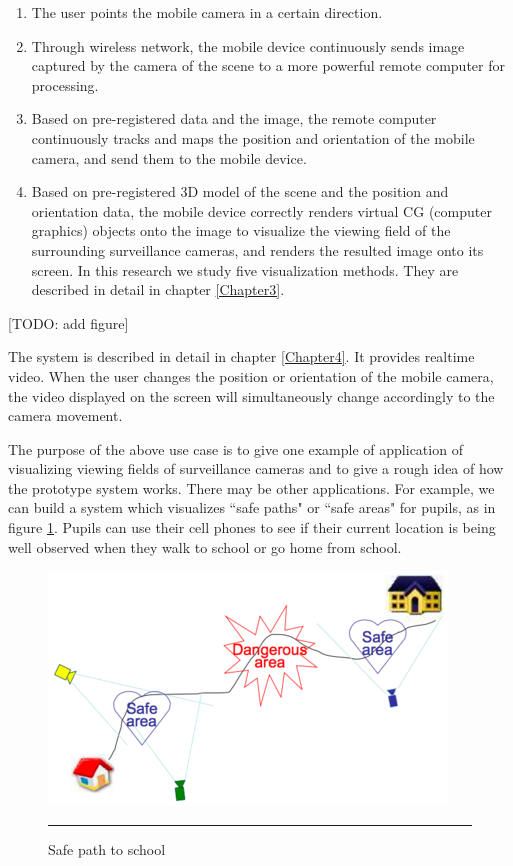 \begin{enumerate}
	\item The user points the mobile camera in a certain direction.
	\item Through wireless network, the mobile device continuously sends image captured by the camera of the scene to a more powerful remote computer for processing.
	\item Based on pre-registered data and the image, the remote computer continuously tracks and maps the position and orientation of the mobile camera, and send them to the mobile device.
	\item Based on pre-registered 3D model of the scene and the position and orientation data, the mobile device correctly renders virtual CG (computer graphics) objects onto the image to visualize the viewing field of the surrounding surveillance cameras, and renders the resulted image onto its screen. In this research we study five visualization methods. They are described in detail in chapter \ref{Chapter3}.
\end{enumerate}

[TODO: add figure]

The system is described in detail in chapter \ref{Chapter4}. It provides realtime video. When the user changes the position or orientation of the mobile camera, the video displayed on the screen will simultaneously change accordingly to the camera movement.

The purpose of the above use case is to give one example of application of visualizing viewing fields of surveillance cameras and to give a rough idea of how the prototype system works. There may be other applications. For example, we can build a system which visualizes ``safe paths" or ``safe areas" for pupils, as in figure \ref{fig:HomeSchool}. Pupils can use their cell phones to see if their current location is being well observed when they walk to school or go home from school.

\begin{figure}[htbp]
	\centering
	\includegraphics{./Primitives/home_school.png}
	\rule{35em}{0.5pt}
	\caption[Safe path to school]{Safe path to school}
	\label{fig:HomeSchool}
\end{figure}
